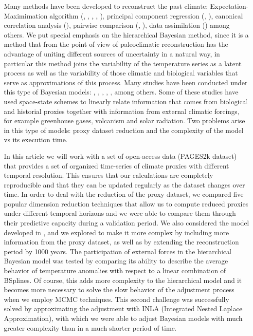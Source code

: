 \documentclass[11pt]{amsart}
\theoremstyle{plain}
\theoremstyle{definition}
\theoremstyle{remark}
\begin{document}
Many methods have been developed to reconstruct the past climate:
Expectation-Maximimation algorithm (\cite{mann2005testing},
\cite{mann2007robust}, \cite{rutherford2003climate}, \cite{bradley2005proxy},
\cite{steig2009}), principal component regression
(\cite{luterbacher2004european}, \cite{Wahl2012}), canonical
correlation analysis (\cite{smerdon2010pseudoproxy}), pairwise comparison
(\cite{Hanhijarvi2013}, \cite{Gergis2016}), data assimilation (\cite{Hakim2016}) among
others. We put special emphasis on the hierarchical Bayesian method, since it is
a method that from the point of view of paleoclimatic reconstruction has the
advantage of uniting different sources of uncertainty in a natural way, in
particular this method joins the variability of the temperature series as a
latent process as well as the variability of those climatic and biological
variables that serve as approximations of this process. Many studies have been
conducted under this type of Bayesian models: \cite{boli1}, \cite{tingley1},
\cite{tingley2}, \cite{tingley2013_Ext}, \cite{werner2012pseudoproxy},
\cite{Barboza2014} among others. Some of these studies have used space-state
schemes to linearly relate information that comes from biological and historial
proxies together with information from external climatic forcings, for example
greenhouse gases, volcanism and solar radiation. Two problems arise in this
type of models: proxy dataset reduction and the complexity of the model vs its execution time.

In this article we will work with a set of open-access data (PAGES2k dataset)
that provides a set of organized time-series of climate proxies with different
temporal resolution. This ensures that our calculations are completely
reproducible and that they can be updated regularly as the dataset changes over
time. In order to deal with the reduction of the proxy dataset, we compared five
popular dimension reduction techniques that allow us to compute reduced proxies
under different temporal horizons and we were able to compare them through their
predictive capacity during a validation period. We also considered the model
developed in \cite{Barboza2014}, and we explored to make it more complex by
including more information from the proxy dataset, as well as by extending the
reconstruction period by 1000 years. The participation of external forces in the
hierarchical Bayesian model was tested by comparing its ability to describe the
average behavior of temperature anomalies with respect to a linear combination
of BSplines. Of course, this adds more complexity to the hierarchical model and
it becomes more necessary to solve the slow behavior of the adjustment process
when we employ MCMC techniques. This second challenge was successfully solved by
approximating the adjustment with INLA (Integrated Nested Laplace
Approximation), with which we were able to adjust Bayesian models with much
greater complexity than \cite{Barboza2014} in a much shorter period of time. 
\end{document}

